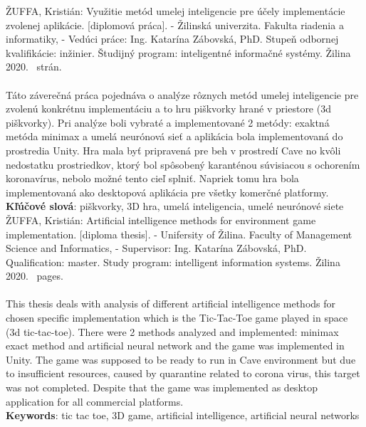 ŽUFFA, Kristián: Využitie metód umelej inteligencie pre účely implementácie zvolenej aplikácie.
[diplomová práca].
- Žilinská univerzita.
Fakulta riadenia a informatiky, -
Vedúci práce: Ing. Katarína Zábovská, PhD.
Stupeň odbornej kvalifikácie: inžinier.
Študijný program: inteligentné informačné systémy.
Žilina 2020.~\pageref{LastPage} strán.
\\
\\
Táto záverečná práca pojednáva o analýze rôznych metód umelej inteligencie pre zvolenú konkrétnu implementáciu a to hru
piškvorky hrané v priestore (3d piškvorky).
Pri analýze boli vybraté a implementované 2 metódy: exaktná metóda minimax a umelá neurónová sieť a aplikácia bola
implementovaná do prostredia Unity.
Hra mala byť pripravená pre beh v prostredí Cave no kvôli nedostatku prostriedkov, ktorý bol spôsobený karanténou
súvisiacou s ochorením koronavírus, nebolo možné tento cieľ splniť.
Napriek tomu hra bola implementovaná ako desktopová aplikácia pre všetky komerčné platformy.
\\
\textbf{Kľúčové slová}: piškvorky, 3D hra, umelá inteligencia, umelé neurónové siete
\\

ŽUFFA, Kristián: Artificial intelligence methods for environment game implementation.
[diploma thesis].
- Unifersity of Žilina.
Faculty of Management Science and Informatics, -
Supervisor: Ing. Katarína Zábovská, PhD.
Qualification: master.
Study program: intelligent information systems.
Žilina 2020.~\pageref{LastPage} pages.
\\
\\
This thesis deals with analysis of different artificial intelligence methods for chosen specific implementation which
is the Tic-Tac-Toe game played in space (3d tic-tac-toe).
There were 2 methods analyzed and implemented: minimax exact method and artificial neural network and the game was
implemented in Unity.
The game was supposed to be ready to run in Cave environment but due to insufficient resources, caused by quarantine
related to corona virus, this target was not completed.
Despite that the game was implemented as desktop application for all commercial platforms.
\\
\textbf{Keywords}: tic tac toe, 3D game, artificial intelligence, artificial neural networks

